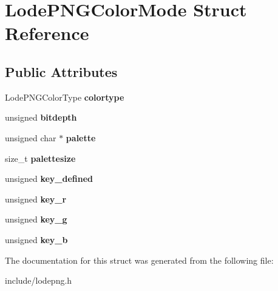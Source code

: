 \hypertarget{struct_lode_p_n_g_color_mode}{}\section{Lode\+P\+N\+G\+Color\+Mode Struct Reference}
\label{struct_lode_p_n_g_color_mode}
\subsection*{Public Attributes}
\begin{DoxyCompactItemize}
\item 
Lode\+P\+N\+G\+Color\+Type {\bfseries colortype}\hypertarget{struct_lode_p_n_g_color_mode_a4f3df7240411abe80546052d197fbe8d}{}\label{struct_lode_p_n_g_color_mode_a4f3df7240411abe80546052d197fbe8d}

\item 
unsigned {\bfseries bitdepth}\hypertarget{struct_lode_p_n_g_color_mode_ad20010b9561980f65281bc17f7848253}{}\label{struct_lode_p_n_g_color_mode_ad20010b9561980f65281bc17f7848253}

\item 
unsigned char $\ast$ {\bfseries palette}\hypertarget{struct_lode_p_n_g_color_mode_a54f0a793238009fcb95f081626fae308}{}\label{struct_lode_p_n_g_color_mode_a54f0a793238009fcb95f081626fae308}

\item 
size\+\_\+t {\bfseries palettesize}\hypertarget{struct_lode_p_n_g_color_mode_a407557f056168682d9319aeb60866dcc}{}\label{struct_lode_p_n_g_color_mode_a407557f056168682d9319aeb60866dcc}

\item 
unsigned {\bfseries key\+\_\+defined}\hypertarget{struct_lode_p_n_g_color_mode_ab9105505c5d56cfc6ce4efe1bb288b54}{}\label{struct_lode_p_n_g_color_mode_ab9105505c5d56cfc6ce4efe1bb288b54}

\item 
unsigned {\bfseries key\+\_\+r}\hypertarget{struct_lode_p_n_g_color_mode_a29e64327bca1f3d16235e9ff471e4d50}{}\label{struct_lode_p_n_g_color_mode_a29e64327bca1f3d16235e9ff471e4d50}

\item 
unsigned {\bfseries key\+\_\+g}\hypertarget{struct_lode_p_n_g_color_mode_ad98309f36d289392b0c440baa50af9f6}{}\label{struct_lode_p_n_g_color_mode_ad98309f36d289392b0c440baa50af9f6}

\item 
unsigned {\bfseries key\+\_\+b}\hypertarget{struct_lode_p_n_g_color_mode_a93a269405fee0d1c5045a1a671ed1de8}{}\label{struct_lode_p_n_g_color_mode_a93a269405fee0d1c5045a1a671ed1de8}

\end{DoxyCompactItemize}


The documentation for this struct was generated from the following file\+:\begin{DoxyCompactItemize}
\item 
include/lodepng.\+h\end{DoxyCompactItemize}
